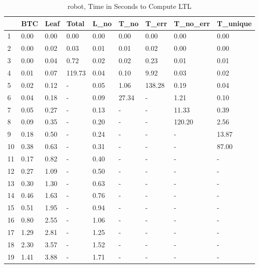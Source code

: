 \begin{table}
\centering
\caption{robot, Time in Seconds to Compute LTL}
\label{robot_LTL_time}
\begin{tabular}{lllllllll}
\toprule
{} &   BTC &  Leaf &   Total &  L\_no &   T\_no &   T\_err & T\_no\_err & T\_unique \\
\midrule
1  &  0.00 &  0.00 &    0.00 &  0.00 &   0.00 &    0.00 &     0.00 &     0.00 \\
2  &  0.00 &  0.02 &    0.03 &  0.01 &   0.01 &    0.02 &     0.00 &     0.00 \\
3  &  0.00 &  0.04 &    0.72 &  0.02 &   0.02 &    0.23 &     0.01 &     0.01 \\
4  &  0.01 &  0.07 &  119.73 &  0.04 &   0.10 &    9.92 &     0.03 &     0.02 \\
5  &  0.02 &  0.12 &       - &  0.05 &   1.06 &  138.28 &     0.19 &     0.04 \\
6  &  0.04 &  0.18 &       - &  0.09 &  27.34 &       - &     1.21 &     0.10 \\
7  &  0.05 &  0.27 &       - &  0.13 &      - &       - &    11.33 &     0.39 \\
8  &  0.09 &  0.35 &       - &  0.20 &      - &       - &   120.20 &     2.56 \\
9  &  0.18 &  0.50 &       - &  0.24 &      - &       - &        - &    13.87 \\
10 &  0.38 &  0.63 &       - &  0.31 &      - &       - &        - &    87.00 \\
11 &  0.17 &  0.82 &       - &  0.40 &      - &       - &        - &        - \\
12 &  0.27 &  1.09 &       - &  0.50 &      - &       - &        - &        - \\
13 &  0.30 &  1.30 &       - &  0.63 &      - &       - &        - &        - \\
14 &  0.46 &  1.63 &       - &  0.76 &      - &       - &        - &        - \\
15 &  0.51 &  1.95 &       - &  0.94 &      - &       - &        - &        - \\
16 &  0.80 &  2.55 &       - &  1.06 &      - &       - &        - &        - \\
17 &  1.29 &  2.81 &       - &  1.25 &      - &       - &        - &        - \\
18 &  2.30 &  3.57 &       - &  1.52 &      - &       - &        - &        - \\
19 &  1.41 &  3.88 &       - &  1.71 &      - &       - &        - &        - \\

\end{tabular}
\end{table}
